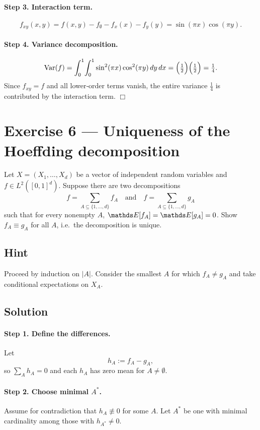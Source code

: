 \documentclass[a4paper]{article}
\begin{document}
\paragraph{Step 3. Interaction term.}
\[
f_{xy}(x,y)
= f(x,y) - f_\emptyset - f_x(x) - f_y(y)
= \sin(\pi x)\cos(\pi y).
\]

\paragraph{Step 4. Variance decomposition.}
\[
\text{Var}(f)
= \int_0^1\!\int_0^1 \sin^2(\pi x)\cos^2(\pi y)\,dy\,dx
= \Bigl(\tfrac12\Bigr)\Bigl(\tfrac12\Bigr)
= \tfrac14.
\]
Since $f_{xy}=f$ and all lower‐order terms vanish, the entire variance
$\tfrac14$ is contributed by the interaction term. \hfill\(\Box\)

\section*{Exercise 6 — Uniqueness of the Hoeffding decomposition}
\label{ex:FA_uniqueness_improved}

Let $X=(X_1,\dots,X_d)$ be a vector of independent random variables and
$f\in L^2([0,1]^d)$.  Suppose there are two decompositions
\[
f=\sum_{A\subseteq\{1,\dots,d\}} f_A
\quad\text{and}\quad
f=\sum_{A\subseteq\{1,\dots,d\}} g_A
\]
such that for every nonempty $A$, $\E[f_A]=\E[g_A]=0$.  Show $f_A\equiv g_A$
for all $A$, i.e.\ the decomposition is unique.

\subsection*{Hint}
Proceed by induction on $|A|$.  Consider the smallest $A$ for which
$f_A\neq g_A$ and take conditional expectations on $X_A$.

\subsection*{Solution}

\paragraph{Step 1. Define the differences.}
Let
\[
h_A := f_A - g_A,
\]
so $\sum_A h_A = 0$ and each $h_A$ has zero mean for $A\neq\emptyset$.

\paragraph{Step 2. Choose minimal $A^*$.}
Assume for contradiction that $h_A\not\equiv0$ for some $A$.  Let $A^*$ be
one with minimal cardinality among those with $h_{A^*}\neq0$.
\end{document}
